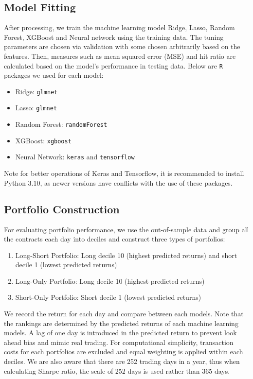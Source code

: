 \documentclass[oneside, 12pt]{article}
\newcommand*{\1}{\text{\scalebox{1.1}{\usefont{U}{bbold}{m}{n}1}}}
\begin{document}
\subsection{Model Fitting}
After processing, we train the machine learning model Ridge, Lasso, Random Forest, XGBoost and Neural network using the training data. The tuning parameters are chosen via validation with some chosen arbitrarily based on the features. Then, measures such as mean squared error (MSE) and hit ratio are calculated based on the model's performance in testing data. Below are \texttt{R} packages we used for each model:
\begin{itemize}
\item Ridge: \texttt{glmnet}
\item Lasso: \texttt{glmnet}
\item Random Forest: \texttt{randomForest}
\item XGBoost: \texttt{xgboost}
\item Neural Network: \texttt{keras} and \texttt{tensorflow}
\end{itemize}
Note for better operations of Keras and Tensorflow, it is recommended to install Python 3.10, as newer versions have conflicts with the use of these packages. 

\subsection{Portfolio Construction}
For evaluating portfolio performance, we use the out-of-sample data and group all the contracts each day into deciles and construct three types of portfolios:
\begin{enumerate}
\item Long-Short Portfolio: Long decile 10 (highest predicted returns) and short decile 1 (lowest predicted returns)
\item Long-Only Portfolio: Long decile 10 (highest predicted returns)
\item Short-Only Portfolio: Short decile 1 (lowest predicted returns)
\end{enumerate}
We record the return for each day and compare between each models. Note that the rankings are determined by the predicted returns of each machine learning models. A lag of one day is introduced in the predicted return to prevent look ahead bias and mimic real trading. For computational simplicity, transaction costs for each portfolios are excluded and equal weighting is applied within each deciles. We are also aware that there are 252 trading days in a year, thus when calculating Sharpe ratio, the scale of 252 days is used rather than 365 days.  \newline
\end{document}
